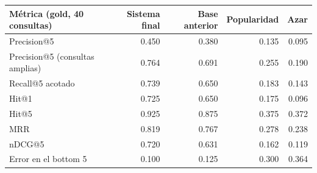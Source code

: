 \begin{tabular}{lrrrr}
\toprule
Métrica (gold, 40 consultas) & Sistema final & Base anterior & Popularidad & Azar \\
\midrule
Precision@5 & 0.450 & 0.380 & 0.135 & 0.095 \\
Precision@5 (consultas amplias) & 0.764 & 0.691 & 0.255 & 0.190 \\
Recall@5 acotado & 0.739 & 0.650 & 0.183 & 0.143 \\
Hit@1 & 0.725 & 0.650 & 0.175 & 0.096 \\
Hit@5 & 0.925 & 0.875 & 0.375 & 0.372 \\
MRR & 0.819 & 0.767 & 0.278 & 0.238 \\
nDCG@5 & 0.720 & 0.631 & 0.162 & 0.119 \\
Error en el bottom 5 & 0.100 & 0.125 & 0.300 & 0.364 \\
\bottomrule
\end{tabular}
